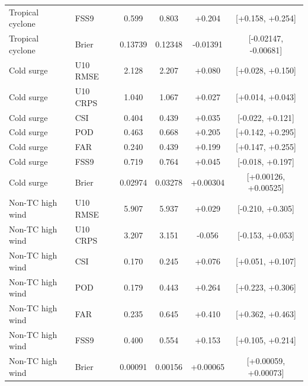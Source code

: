 \begin{tabular}{llcccc}
Tropical cyclone & FSS9 & 0.599 & 0.803 & +0.204 & [+0.158, +0.254] \\
Tropical cyclone & Brier & 0.13739 & 0.12348 & -0.01391 & [-0.02147, -0.00681] \\
Cold surge & U10 RMSE & 2.128 & 2.207 & +0.080 & [+0.028, +0.150] \\
Cold surge & U10 CRPS & 1.040 & 1.067 & +0.027 & [+0.014, +0.043] \\
Cold surge & CSI & 0.404 & 0.439 & +0.035 & [-0.022, +0.121] \\
Cold surge & POD & 0.463 & 0.668 & +0.205 & [+0.142, +0.295] \\
Cold surge & FAR & 0.240 & 0.439 & +0.199 & [+0.147, +0.255] \\
Cold surge & FSS9 & 0.719 & 0.764 & +0.045 & [-0.018, +0.197] \\
Cold surge & Brier & 0.02974 & 0.03278 & +0.00304 & [+0.00126, +0.00525] \\
Non-TC high wind & U10 RMSE & 5.907 & 5.937 & +0.029 & [-0.210, +0.305] \\
Non-TC high wind & U10 CRPS & 3.207 & 3.151 & -0.056 & [-0.153, +0.053] \\
Non-TC high wind & CSI & 0.170 & 0.245 & +0.076 & [+0.051, +0.107] \\
Non-TC high wind & POD & 0.179 & 0.443 & +0.264 & [+0.223, +0.306] \\
Non-TC high wind & FAR & 0.235 & 0.645 & +0.410 & [+0.362, +0.463] \\
Non-TC high wind & FSS9 & 0.400 & 0.554 & +0.153 & [+0.105, +0.214] \\
Non-TC high wind & Brier & 0.00091 & 0.00156 & +0.00065 & [+0.00059, +0.00073] \\
\hline
\end{tabular}
